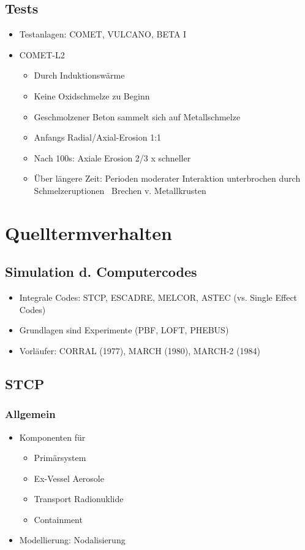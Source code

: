 \documentclass[12pt]{article}
\begin{document}
\subsection{Tests}
\begin{itemize}
  \item Testanlagen: COMET, VULCANO, BETA I
  \item COMET-L2
  \begin{itemize}
    \item Durch Induktionswärme
    \item Keine Oxidschmelze zu Beginn
    \item Geschmolzener Beton sammelt sich auf Metallschmelze
    \item Anfangs Radial/Axial-Erosion 1:1
    \item Nach 100s: Axiale Erosion 2/3 x schneller
    \item Über längere Zeit: Perioden moderater Interaktion unterbrochen durch Schmelzeruptionen
    \textrightarrow\ Brechen v. Metallkrusten
  \end{itemize}
\end{itemize}

\section{Quelltermverhalten}

\subsection{Simulation d. Computercodes}
\begin{itemize}
  \item Integrale Codes: STCP, ESCADRE, MELCOR, ASTEC (vs. Single Effect Codes)
  \item Grundlagen sind Experimente (PBF, LOFT, PHEBUS)
  \item Vorläufer: CORRAL (1977), MARCH (1980), MARCH-2 (1984)
\end{itemize}

\subsection{STCP}

\subsubsection{Allgemein}
\begin{itemize}
  \item Komponenten für
  \begin{itemize}
    \item Primärsystem
    \item Ex-Vessel Aerosole
    \item Transport Radionuklide
    \item Containment
  \end{itemize}
  \item Modellierung: Nodalisierung
\end{itemize}
\end{document}
